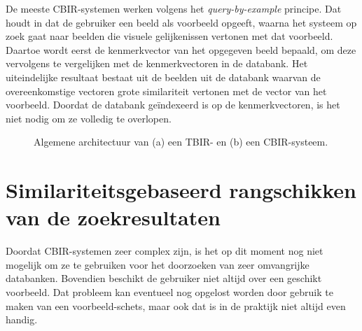 De meeste CBIR-systemen werken volgens het \emph{query-by-example} principe. Dat houdt in dat de
gebruiker een beeld als voorbeeld opgeeft, waarna het systeem op zoek gaat naar beelden
die visuele gelijkenissen vertonen met dat voorbeeld. Daartoe wordt eerst de kenmerkvector van
het opgegeven beeld bepaald, om deze vervolgens te vergelijken met de kenmerkvectoren in
de databank. Het uiteindelijke resultaat bestaat uit de beelden uit de databank 
waarvan de overeenkomstige vectoren grote similariteit vertonen met de vector van het 
voorbeeld. Doordat de databank ge\"indexeerd is op de kenmerkvectoren, is het niet nodig
om ze volledig te overlopen.

\begin{figure}[tb]
\begin{center}
\vspace{5pt}
\caption{\label{fig:cbir_en_tbir}Algemene architectuur van (a) een TBIR- en 
(b) een CBIR-systeem.}
\end{center}
\end{figure}

\section{Similariteitsgebaseerd rangschikken van de zoekresultaten}

Doordat CBIR-systemen zeer complex zijn, is het op dit moment nog niet mogelijk om ze te gebruiken voor het 
doorzoeken van zeer omvangrijke databanken. Bovendien beschikt de gebruiker niet altijd over
een geschikt voorbeeld. Dat probleem kan eventueel nog opgelost worden door gebruik
te maken van een voorbeeld-schets, maar ook dat is in de praktijk niet altijd even handig.

